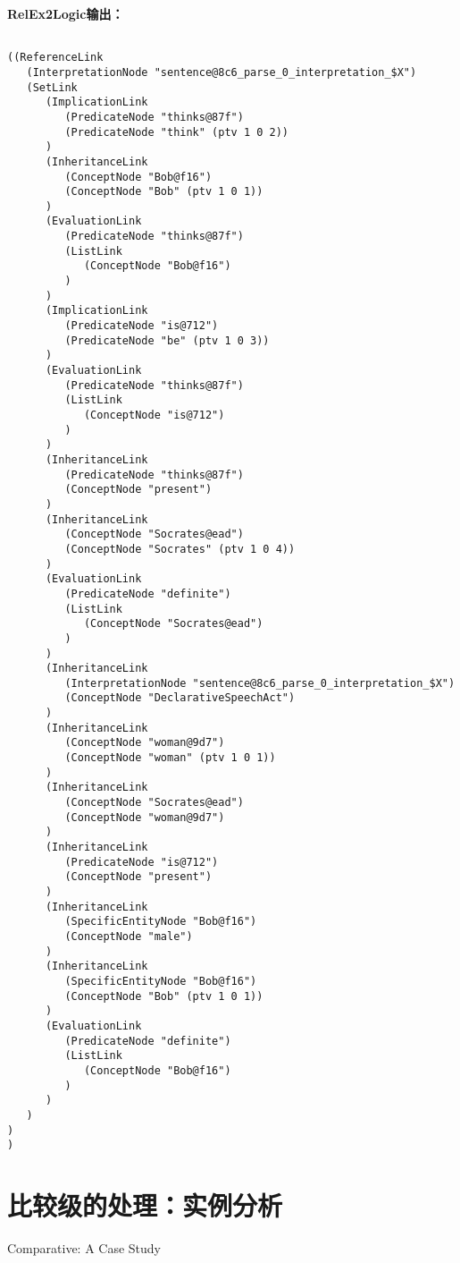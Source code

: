 {\bf RelEx2Logic输出：}

 {\tt\begin{small}\begin{lstlisting}

((ReferenceLink
   (InterpretationNode "sentence@8c6_parse_0_interpretation_$X")
   (SetLink
      (ImplicationLink
         (PredicateNode "thinks@87f")
         (PredicateNode "think" (ptv 1 0 2))
      )
      (InheritanceLink
         (ConceptNode "Bob@f16")
         (ConceptNode "Bob" (ptv 1 0 1))
      )
      (EvaluationLink
         (PredicateNode "thinks@87f")
         (ListLink
            (ConceptNode "Bob@f16")
         )
      )
      (ImplicationLink
         (PredicateNode "is@712")
         (PredicateNode "be" (ptv 1 0 3))
      )
      (EvaluationLink
         (PredicateNode "thinks@87f")
         (ListLink
            (ConceptNode "is@712")
         )
      )
      (InheritanceLink
         (PredicateNode "thinks@87f")
         (ConceptNode "present")
      )
      (InheritanceLink
         (ConceptNode "Socrates@ead")
         (ConceptNode "Socrates" (ptv 1 0 4))
      )
      (EvaluationLink
         (PredicateNode "definite")
         (ListLink
            (ConceptNode "Socrates@ead")
         )
      )
      (InheritanceLink
         (InterpretationNode "sentence@8c6_parse_0_interpretation_$X")
         (ConceptNode "DeclarativeSpeechAct")
      )
      (InheritanceLink
         (ConceptNode "woman@9d7")
         (ConceptNode "woman" (ptv 1 0 1))
      )
      (InheritanceLink
         (ConceptNode "Socrates@ead")
         (ConceptNode "woman@9d7")
      )
      (InheritanceLink
         (PredicateNode "is@712")
         (ConceptNode "present")
      )
      (InheritanceLink
         (SpecificEntityNode "Bob@f16")
         (ConceptNode "male")
      )
      (InheritanceLink
         (SpecificEntityNode "Bob@f16")
         (ConceptNode "Bob" (ptv 1 0 1))
      )
      (EvaluationLink
         (PredicateNode "definite")
         (ListLink
            (ConceptNode "Bob@f16")
         )
      )
   )
)
)

\end{lstlisting}\end{small}}

\section{比较级的处理：实例分析}{Comparative: A Case Study}  

